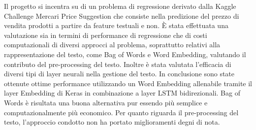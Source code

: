 
Il progetto si incentra su di un problema di regressione derivato dalla Kaggle
Challenge Mercari Price Suggestion che consiste nella predizione del prezzo di
vendita prodotti a partire da feature testuali e non. È stata effettuata una
valutazione sia in termini di performance di regressione che di costi
computazionali di diversi approcci al problema, soprattutto relativi alla
rappresentazione del testo, come Bag of Words e Word Embedding, valutando il
contributo del pre-processing del testo. Inoltre è stata valutata l'efficacia di
diversi tipi di layer neurali nella gestione del testo. In conclusione sono
state ottenute ottime performance utilizzando un Word Embedding allenabile
tramite il layer Embedding di Keras in combinazione a layer LSTM bidirezionali.
Bag of Words è risultata una buona alternativa pur essendo più semplice e
computazionalmente più economico. Per quanto riguarda il pre-processing del
testo, l'approccio condotto non ha portato miglioramenti degni di nota.